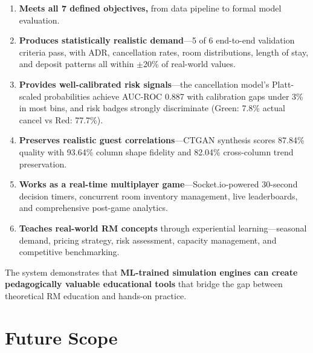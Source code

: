 \documentclass[12pt,a4paper,openany]{report}
\begin{document}
\begin{enumerate}
  \item \textbf{Meets all 7 defined objectives,} from data pipeline to formal model evaluation.

  \item \textbf{Produces statistically realistic demand}---5 of 6 end-to-end validation criteria pass, with ADR, cancellation rates, room distributions, length of stay, and deposit patterns all within $\pm$20\% of real-world values.

  \item \textbf{Provides well-calibrated risk signals}---the cancellation model's Platt-scaled probabilities achieve AUC-ROC 0.887 with calibration gaps under 3\% in most bins, and risk badges strongly discriminate (Green: 7.8\% actual cancel vs Red: 77.7\%).

  \item \textbf{Preserves realistic guest correlations}---CTGAN synthesis scores 87.84\% quality with 93.64\% column shape fidelity and 82.04\% cross-column trend preservation.

  \item \textbf{Works as a real-time multiplayer game}---Socket.io-powered 30-second decision timers, concurrent room inventory management, live leaderboards, and comprehensive post-game analytics.

  \item \textbf{Teaches real-world RM concepts} through experiential learning---seasonal demand, pricing strategy, risk assessment, capacity management, and competitive benchmarking.
\end{enumerate}

The system demonstrates that \textbf{ML-trained simulation engines can create pedagogically valuable educational tools} that bridge the gap between theoretical RM education and hands-on practice.


\chapter{Future Scope}
\label{ch:future}
\end{document}
